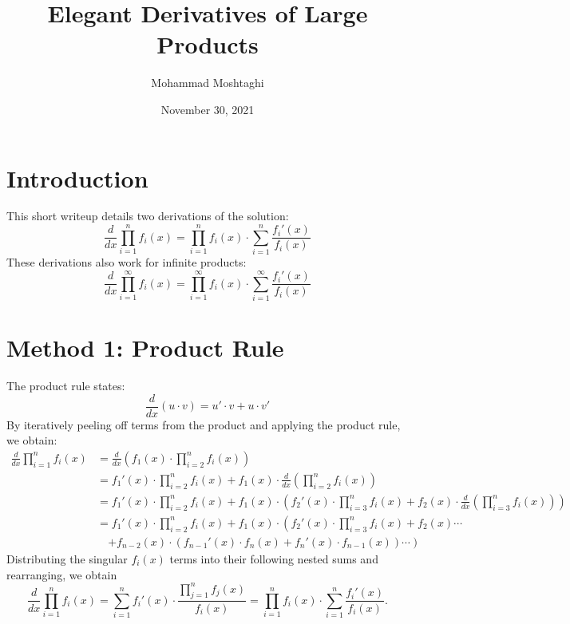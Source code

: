 \documentclass[10pt]{article}
\title{Elegant Derivatives of Large Products}
\author{Mohammad Moshtaghi}
\date{November 30, 2021}
\begin{document}
\thispagestyle{firststyle}

\maketitle




\section*{Introduction}

This short writeup details two derivations of the solution:
\[\frac{d}{dx}\prod_{i=1}^n f_i(x) = \prod_{i=1}^n f_i(x) \cdot \sum_{i=1}^n \frac{f_i'(x)}{f_i(x)}\]
These derivations also work for infinite products:
\[\frac{d}{dx}\prod_{i=1}^\infty f_i(x) = \prod_{i=1}^\infty f_i(x) \cdot \sum_{i=1}^\infty \frac{f_i'(x)}{f_i(x)}\]




\section*{Method 1: Product Rule}

The product rule states:
\[\frac{d}{dx}(u \cdot v) = u' \cdot v + u \cdot v'\]
By iteratively peeling off terms from the product and applying the product rule, we obtain:
\begin{align*}
    \frac{d}{dx} \prod_{i=1}^n f_i(x) &= \frac{d}{dx} \left(f_1(x) \cdot \prod_{i=2}^n f_i(x)\right) \\
    &= f_1'(x) \cdot \prod_{i=2}^n f_i(x) + f_1(x) \cdot \frac{d}{dx} \left(\prod_{i=2}^n f_i(x)\right) \\
    &= f_1'(x) \cdot \prod_{i=2}^n f_i(x) + f_1(x) \cdot \left(f_2'(x) \cdot \prod_{i=3}^n f_i(x) + f_2(x) \cdot \frac{d}{dx} \left(\prod_{i=3}^n f_i(x)\right)\right) \\
    &= f_1'(x) \cdot \prod_{i=2}^n f_i(x) + f_1(x) \cdot \left(f_2'(x) \cdot \prod_{i=3}^n f_i(x) + f_2(x) \cdots \right. \\
    &\quad \left. + f_{n-2}(x) \cdot \left(f_{n-1}'(x) \cdot f_n(x) + f_n'(x) \cdot f_{n-1}(x)\right) \cdots \right)
\end{align*}
Distributing the singular $f_i(x)$ terms into their following nested sums and rearranging, we obtain
\[\frac{d}{dx} \prod_{i=1}^n f_i(x) = \sum_{i=1}^n f_i'(x) \cdot \frac{\prod_{j=1}^n f_j(x)}{f_i(x)}
= \prod_{i=1}^n f_i(x) \cdot \sum_{i=1}^n \frac{f_i'(x)}{f_i(x)}.\]
\end{document}
